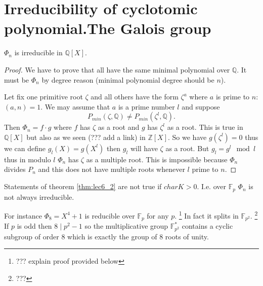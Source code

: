 \section{Irreducibility of cyclotomic polynomial.The Galois group}

\begin{theorem}
  $\Phi_n$ is irreducible in $\mathbb{Q}\left[X\right]$.
  \begin{proof}
    We have to prove that all  have
    the same minimal polynomial over $\mathbb{Q}$. It must be $\Phi_n$
    by degree reason (minimal polynomial degree should be $n$).

    Let fix one primitive root $\zeta$ and all others have the form
    $\zeta^a$ where $a$ is prime to $n$: $\left(a,n\right)=1$. We may
    assume that $a$ is a prime number $l$ and suppose
    \[
    P_{min}\left(\zeta, \mathbb{Q}\right)
    \ne
    P_{min}\left(\zeta^l, \mathbb{Q}\right).
    \]
    Then $\Phi_n = f \cdot g$ where $f$ has $\zeta$ as a root and $g$
    has $\zeta^l$ as a root. This is true in
    $\mathbb{Q}\left[X\right]$ but also as we seen (??? add a link) in
    $\mathbb{Z}\left[X\right]$. So we have $g\left(\zeta^l\right) = 0$
    thus we can define $g_l\left(X\right) = g\left(X^l\right)$ then
    $g_l$ will have $\zeta$ as a root. But $g_l = g^l \mod l$ thus in
    modulo $l$ $\Phi_n$ has $\zeta$ as a multiple root. This is
    impossible because $\Phi_n$ divides $P_n$ and this does not have
    multiple roots whenever $l$ prime to $n$. 
  \end{proof}
  \label{thm:lec6_2}
\end{theorem}

\begin{remark}
  Statements of theorem \ref{thm:lec6_2} are not true if $char K >
  0$. I.e. over $\mathbb{F}_p$ $\Phi_n$ is not always irreducible.

  For instance $\Phi_8 = X^4 + 1$ is reducible over $\mathbb{F}_p$ for
  any $p$.
  \footnote{
    ??? explain proof provided below
  }
  In fact it splits in $\mathbb{F}_{p^2}$.
  \footnote{
    ???
  }
  If $p$ is odd then $8\mid p^2-1$ so the multiplicative group
  $\mathbb{F}_{p^2}^*$ contains a cyclic subgroup of order 8 which is
  exactly the group of 8 roots of unity.
\end{remark}

